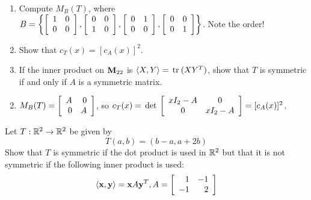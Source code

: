 \begin{multicols}{2}
\begin{ex}
\begin{enumerate}[label={\alph*.}]
\item Compute $M_{B}(T)$, where \\
\hspace*{-2em}$B = 
\left\{
\left[ \begin{array}{rr}
1 & 0 \\
0 & 0
\end{array} \right]
,
\left[ \begin{array}{rr}
0 & 0 \\
1 & 0
\end{array} \right]
,
\left[ \begin{array}{rr}
0 & 1 \\
0 & 0
\end{array} \right]
,
\left[ \begin{array}{rr}
0 & 0 \\
0 & 1
\end{array} \right]
\right\}$. Note the order!

\item Show that $c_T(x) = [c_A(x)]^2 $.

\item If the inner product on $\textbf{M}_{22}$ is $\langle X, Y \rangle = \thinspace\operatorname{tr\medspace}(XY^{T})$, show that $T$ is symmetric if and only if $A$ is a symmetric matrix.

\end{enumerate}
\begin{sol}
\begin{enumerate}[label={\alph*.}]
\setcounter{enumi}{1}
\item  
$M_B(T) = 
\left[ \begin{array}{rr}
A & 0 \\
0 & A
\end{array} \right]$, so $
c_T(x) = \thinspace\operatorname{det\medspace} 
\left[ \begin{array}{cc}
xI_2 - A & 0 \\
0 & xI_2 - A
\end{array} \right]
= [c_A(x)]^2$.

\end{enumerate}
\end{sol}
\end{ex}

\begin{ex}
Let $T : \mathbb{R}^2 \to \mathbb{R}^2$ be given by 
\begin{equation*}
T(a, b) = (b - a, a + 2b)
\end{equation*} Show that $T$ is symmetric if the dot product is used in $\mathbb{R}^2$ but that it is not symmetric if the following inner product is used:
\begin{equation*}
\langle \textbf{x}, \textbf{y} \rangle = \textbf{x} A \textbf{y}^T, A =
\left[ \begin{array}{rr}
1 & -1 \\
-1 & 2
\end{array} \right] 
\end{equation*}
\end{ex}


\end{multicols}
